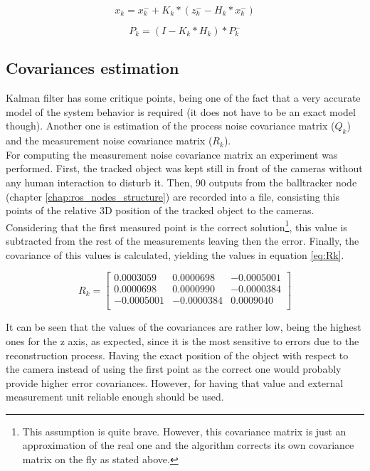 \begin{equation}
x_{k}=x_{k}^{-}+K_{k}*(z_{k}^{-}-H_{k}*x_{k}^{-})
\label{eq:final_state}
\end{equation}

\begin{equation}
P_{k}=(I-K_{k}*H_{k})*P_{k}^{-}
\label{eq:error_covariance}
\end{equation}

\subsection{Covariances estimation}
Kalman filter has some critique points, being one of the fact that a very accurate model of the system behavior is required (it does not have to be an exact model though). Another one is estimation of the process noise covariance matrix ($Q_{k}$) and the measurement noise covariance matrix ($R_{k}$).\\

For computing the measurement noise covariance matrix an experiment was performed. First, the tracked object was kept still in front of the cameras without any human interaction to disturb it. Then, 90 outputs from the balltracker node (chapter \ref{chap:ros_nodes_structure}) are recorded into a file, consisting this points of the relative 3D position of the tracked object to the cameras. Considering that the first measured point is the correct solution\footnote{This assumption is quite brave. However, this covariance matrix is just an approximation of the real one and the algorithm corrects its own covariance matrix on the fly as stated above.}, this value is subtracted from the rest of the measurements leaving then the error. Finally, the covariance of this values is calculated, yielding the values in equation \ref{eq:Rk}.

\begin{equation}
R_{k}=
\begin{bmatrix}
0.0003059 & 0.0000698 & -0.0005001 \\
0.0000698 & 0.0000990 & -0.0000384 \\
-0.0005001 & -0.0000384 & 0.0009040 \\
\end{bmatrix}
\label{eq:Rk}
\end{equation}

It can be seen that the values of the covariances are rather low, being the highest ones for the z axis, as expected, since it is the most sensitive to errors due to the reconstruction process. Having the exact position of the object with respect to the camera instead of using the first point as the correct one would probably provide higher error covariances. However, for having that value and external measurement unit reliable enough should be used. \\

